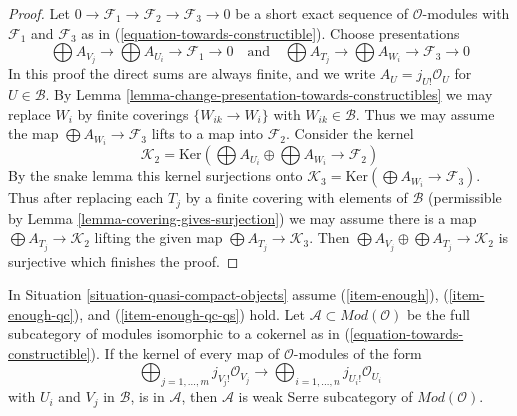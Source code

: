 \begin{proof}
Let $0 \to \mathcal{F}_1 \to \mathcal{F}_2 \to \mathcal{F}_3 \to 0$
be a short exact sequence of $\mathcal{O}$-modules with
$\mathcal{F}_1$ and $\mathcal{F}_3$ as in
(\ref{equation-towards-constructible}). Choose presentations
$$
\bigoplus A_{V_j} \to \bigoplus A_{U_i} \to \mathcal{F}_1 \to 0
\quad\text{and}\quad
\bigoplus A_{T_j} \to \bigoplus A_{W_i} \to \mathcal{F}_3 \to 0
$$
In this proof the direct sums are always finite, and
we write $A_U = j_{U!}\mathcal{O}_U$ for $U \in \mathcal{B}$.
By Lemma \ref{lemma-change-presentation-towards-constructibles}
we may replace $W_i$ by finite coverings $\{W_{ik} \to W_i\}$
with $W_{ik} \in \mathcal{B}$. Thus we may assume the map
$\bigoplus A_{W_i} \to \mathcal{F}_3$ lifts to a map into $\mathcal{F}_2$.
Consider the kernel
$$
\mathcal{K}_2 = \text{Ker}(\bigoplus A_{U_i} \oplus \bigoplus A_{W_i}
\longrightarrow \mathcal{F}_2)
$$
By the snake lemma this kernel surjections onto
$\mathcal{K}_3 = \text{Ker}(\bigoplus A_{W_i} \to \mathcal{F}_3)$.
Thus after replacing each $T_j$ by a finite covering with
elements of $\mathcal{B}$ (permissible by
Lemma \ref{lemma-covering-gives-surjection})
we may assume there is a map
$\bigoplus A_{T_j} \to \mathcal{K}_2$ lifting the given map
$\bigoplus A_{T_j} \to \mathcal{K}_3$.
Then $\bigoplus A_{V_j} \oplus \bigoplus A_{T_j} \to \mathcal{K}_2$
is surjective which finishes the proof.
\end{proof}

\begin{lemma}
\label{lemma-towards-constructible-when-serre-subcategory}
In Situation \ref{situation-quasi-compact-objects} assume
(\ref{item-enough}), (\ref{item-enough-qc}), and (\ref{item-enough-qc-qs})
hold. Let $\mathcal{A} \subset \textit{Mod}(\mathcal{O})$ be the full
subcategory of modules isomorphic to a cokernel as in
(\ref{equation-towards-constructible}).
If the kernel of every map of $\mathcal{O}$-modules of the form
$$
\bigoplus\nolimits_{j = 1, \ldots, m} j_{V_j!}\mathcal{O}_{V_j}
\longrightarrow
\bigoplus\nolimits_{i = 1, \ldots, n} j_{U_i!}\mathcal{O}_{U_i}
$$
with $U_i$ and $V_j$ in $\mathcal{B}$, is in $\mathcal{A}$, then
$\mathcal{A}$ is weak Serre subcategory of $\textit{Mod}(\mathcal{O})$.
\end{lemma}

